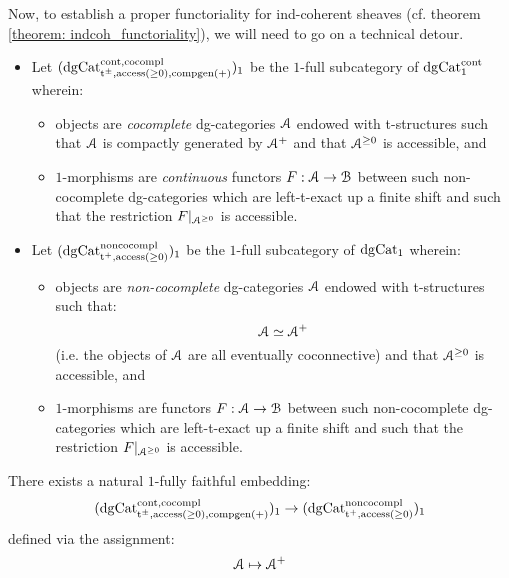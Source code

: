                 Now, to establish a proper functoriality for ind-coherent sheaves (cf. theorem \ref{theorem: indcoh_functoriality}), we will need to go on a technical detour.
                \begin{convention}
                    \noindent
                    \begin{itemize}
                        \item Let $(\mathrm{dg}\mathrm{Cat}^{\mathrm{cont}, \mathrm{co}\mathrm{compl}}_{\mathrm{t}^{\pm}, \mathrm{access}(\geq 0), \mathrm{comp}\mathrm{gen}(+)})_1$ be the $1$-full subcategory of $\mathrm{dg}\mathrm{Cat}^{\mathrm{cont}}_1$ wherein:
                            \begin{itemize}
                                \item objects are \textit{cocomplete} dg-categories $\mathcal{A}$ endowed with t-structures such that $\mathcal{A}$ is compactly generated by $\mathcal{A}^+$ and that $\mathcal{A}^{\geq 0}$ is accessible, and
                                \item $1$-morphisms are \textit{continuous} functors $F: \mathcal{A} \to \mathcal{B}$ between such non-cocomplete dg-categories which are left-t-exact up a finite shift and such that the restriction $F|_{\mathcal{A}^{\geq 0}}$ is accessible. 
                            \end{itemize}
                        \item Let $(\mathrm{dg}\mathrm{Cat}^{\mathrm{non}\mathrm{co}\mathrm{compl}}_{\mathrm{t}^+, \mathrm{access}(\geq 0)})_1$ be the $1$-full subcategory of $\mathrm{dg}\mathrm{Cat}_1$ wherein:
                            \begin{itemize}
                                \item objects are \textit{non-cocomplete} dg-categories $\mathcal{A}$ endowed with t-structures such that:
                                    $$\mathcal{A} \simeq \mathcal{A}^+$$
                                (i.e. the objects of $\mathcal{A}$ are all eventually coconnective) and that $\mathcal{A}^{\geq 0}$ is accessible, and
                                \item $1$-morphisms are functors $F: \mathcal{A} \to \mathcal{B}$ between such non-cocomplete dg-categories which are left-t-exact up a finite shift and such that the restriction $F|_{\mathcal{A}^{\geq 0}}$ is accessible. 
                            \end{itemize}
                    \end{itemize}
                \end{convention}
                \begin{lemma} \label{lemma: selecting_a_compact_generator}
                    There exists a natural $1$-fully faithful embedding:
                        $$(\mathrm{dg}\mathrm{Cat}^{\mathrm{cont}, \mathrm{co}\mathrm{compl}}_{\mathrm{t}^{\pm}, \mathrm{access}(\geq 0), \mathrm{comp}\mathrm{gen}(+)})_1 \to (\mathrm{dg}\mathrm{Cat}^{\mathrm{non}\mathrm{co}\mathrm{compl}}_{\mathrm{t}^+, \mathrm{access}(\geq 0)})_1$$
                    defined via the assignment:
                        $$\mathcal{A} \mapsto \mathcal{A}^+$$
                \end{lemma}

